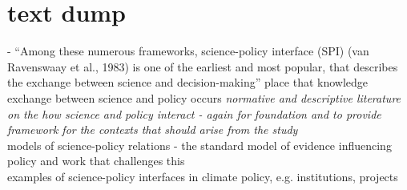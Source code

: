 

\iffalse

\section{text dump}

\cite{JagannathanEtAl2023} - ``Among these numerous frameworks, science-policy interface (SPI) (van Ravenswaay et al., 1983) is one of the earliest and most popular, that describes the exchange between science and decision-making''
place that knowledge exchange between science and policy occurs
\emph{normative and descriptive literature on the how science and policy interact - again for foundation and to provide framework for the contexts that should arise from the study}\\
models of science-policy relations - the standard model of evidence influencing policy and work that challenges this\\
examples of science-policy interfaces in climate policy, e.g. institutions, projects








